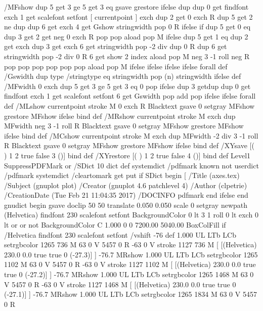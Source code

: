 /MFshow {
   { dup 5 get 3 ge
     { 5 get 3 eq {gsave} {grestore} ifelse }
     {dup dup 0 get findfont exch 1 get scalefont setfont
     [ currentpoint ] exch dup 2 get 0 exch R dup 5 get 2 ne {dup dup 6
     get exch 4 get {Gshow} {stringwidth pop 0 R} ifelse }if dup 5 get 0 eq
     {dup 3 get {2 get neg 0 exch R pop} {pop aload pop M} ifelse} {dup 5
     get 1 eq {dup 2 get exch dup 3 get exch 6 get stringwidth pop -2 div
     dup 0 R} {dup 6 get stringwidth pop -2 div 0 R 6 get
     show 2 index {aload pop M neg 3 -1 roll neg R pop pop} {pop pop pop
     pop aload pop M} ifelse }ifelse }ifelse }
     ifelse }
   forall} def
/Gswidth {dup type /stringtype eq {stringwidth} {pop (n) stringwidth} ifelse} def
/MFwidth {0 exch { dup 5 get 3 ge { 5 get 3 eq { 0 } { pop } ifelse }
 {dup 3 get{dup dup 0 get findfont exch 1 get scalefont setfont
     6 get Gswidth pop add} {pop} ifelse} ifelse} forall} def
/MLshow { currentpoint stroke M
  0 exch R
  Blacktext {gsave 0 setgray MFshow grestore} {MFshow} ifelse } bind def
/MRshow { currentpoint stroke M
  exch dup MFwidth neg 3 -1 roll R
  Blacktext {gsave 0 setgray MFshow grestore} {MFshow} ifelse } bind def
/MCshow { currentpoint stroke M
  exch dup MFwidth -2 div 3 -1 roll R
  Blacktext {gsave 0 setgray MFshow grestore} {MFshow} ifelse } bind def
/XYsave    { [( ) 1 2 true false 3 ()] } bind def
/XYrestore { [( ) 1 2 true false 4 ()] } bind def
Level1 SuppressPDFMark or 
{} {
/SDict 10 dict def
systemdict /pdfmark known not {
  userdict /pdfmark systemdict /cleartomark get put
} if
SDict begin [
  /Title (axes.tex)
  /Subject (gnuplot plot)
  /Creator (gnuplot 4.6 patchlevel 4)
  /Author (clpetrie)
  /CreationDate (Tue Feb 21 11:04:35 2017)
  /DOCINFO pdfmark
end
} ifelse
end
gnudict begin
gsave
doclip
50 50 translate
0.050 0.050 scale
0 setgray
newpath
(Helvetica) findfont 230 scalefont setfont
BackgroundColor 0 lt 3 1 roll 0 lt exch 0 lt or or not {BackgroundColor C 1.000 0 0 7200.00 5040.00 BoxColFill} if
/Helvetica findfont 230 scalefont setfont
/vshift -76 def
1.000 UL
LTb
LCb setrgbcolor
1265 736 M
63 0 V
5457 0 R
-63 0 V
stroke
1127 736 M
[ [(Helvetica) 230.0 0.0 true true 0 (-27.3)]
] -76.7 MRshow
1.000 UL
LTb
LCb setrgbcolor
1265 1102 M
63 0 V
5457 0 R
-63 0 V
stroke
1127 1102 M
[ [(Helvetica) 230.0 0.0 true true 0 (-27.2)]
] -76.7 MRshow
1.000 UL
LTb
LCb setrgbcolor
1265 1468 M
63 0 V
5457 0 R
-63 0 V
stroke
1127 1468 M
[ [(Helvetica) 230.0 0.0 true true 0 (-27.1)]
] -76.7 MRshow
1.000 UL
LTb
LCb setrgbcolor
1265 1834 M
63 0 V
5457 0 R
